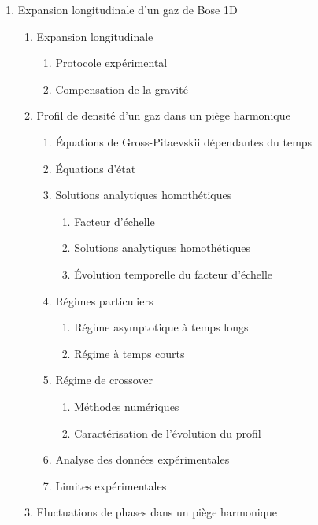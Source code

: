 \documentclass[8pt, landscape]{report}
\begin{document}
\begin{multicols}{3}
\begin{enumerate}
    \item Expansion longitudinale d’un gaz de Bose 1D
    \begin{enumerate}
        \item Expansion longitudinale
        \begin{enumerate}
            \item Protocole expérimental
            \item Compensation de la gravité
        \end{enumerate}
        \item Profil de densité d’un gaz dans un piège harmonique
        \begin{enumerate}
            \item Équations de Gross-Pitaevskii dépendantes du temps
            \item Équations d’état
            \item Solutions analytiques homothétiques
            \begin{enumerate}
                \item Facteur d’échelle
                \item Solutions analytiques homothétiques
                \item Évolution temporelle du facteur d’échelle
            \end{enumerate}
            \item Régimes particuliers
            \begin{enumerate}
                \item Régime asymptotique à temps longs
                \item Régime à temps courts
            \end{enumerate}
            \item Régime de crossover
            \begin{enumerate}
                \item Méthodes numériques
                \item Caractérisation de l’évolution du profil
            \end{enumerate}
            \item Analyse des données expérimentales
            \item Limites expérimentales
        \end{enumerate}
        \item Fluctuations de phases dans un piège harmonique
        \begin{enumerate}

\end{enumerate}
\end{enumerate}
\end{enumerate}
\end{multicols}
\end{document}
